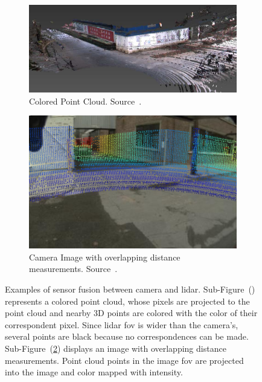 \begin{figure}[!ht]
	\centering
	\begin{subfigure}[t]{0.55\textwidth}
		\includegraphics[width=\textwidth]{img/sensor_fusion/colored_point_cloud.png}
		\caption{Colored Point Cloud. Source~\cite{Gong2013}.}
		\label{fig:colored_point_cloud_example}
	\end{subfigure}
	\quad
	\begin{subfigure}[t]{0.40\textwidth}
		\includegraphics[width=\textwidth]{img/sensor_fusion/image_with_distance_point_cutted.png}
		\caption{Camera Image with overlapping distance measurements. Source~\cite{Bileschi2009}.}
		\label{fig:image_with_lidar_distance}
	\end{subfigure}
	\caption[Examples of state of the art sensor fusion results between camera and \acs{lidar} data.]{Examples of sensor fusion between camera and \ac{lidar}. Sub-Figure~() represents a colored point cloud, whose pixels are projected to the point cloud and nearby 3D points are colored with the color of their correspondent pixel. Since \ac{lidar} \ac{fov} is wider than the camera's, several points are black because no correspondences can be made. Sub-Figure~(\ref{fig:image_with_lidar_distance}) displays an image with overlapping distance measurements. Point cloud points in the image \ac{fov} are projected into the image and color mapped with intensity.}
	\label{fig:point_cloud_camera_fusion_example}
\end{figure}

